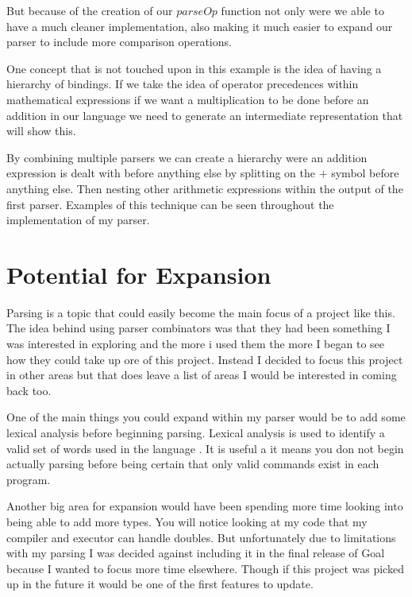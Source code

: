 But because of the creation of our $parseOp$ function not only were we able to have a much cleaner implementation, also making it  much easier to expand our parser to include more comparison operations.

One concept that is not touched upon in this example is the idea of having a hierarchy of bindings. If we take the idea of operator precedences within mathematical expressions if we want a multiplication to be done before an addition in our language we need to generate an intermediate representation that will show this.

By combining multiple parsers we can create a hierarchy were an addition expression is dealt with before anything else by splitting on the $+$ symbol before anything else. Then nesting other arithmetic expressions within the output of the first parser. Examples of this technique can be seen throughout the implementation of my parser.


\section{Potential for Expansion}

Parsing is a topic that could easily become the main focus of a project like this. The idea behind using parser combinators was that they had been something I was interested in exploring and the more i used them the more I began to see how they could take up ore of this project. Instead I decided to focus this project in other areas but that does leave a list of areas I would be interested in coming back too. 

One of the main things you could expand within my parser would be to add some lexical analysis before beginning parsing. Lexical analysis is used to identify a valid set of words used in the language \cite[p.~13]{CompDes2005}. It is useful a it means you don not begin actually parsing before being certain that only valid commands exist in each program.

Another big area for expansion would have been spending more time looking into being able to add more types. You will notice looking at my code that my compiler and executor can handle doubles. But unfortunately due to limitations with my parsing I was decided against including it in the final release of Goal because I wanted to focus more time elsewhere. Though if this project was picked up in the future it would be one of the first features to update.    

   
 